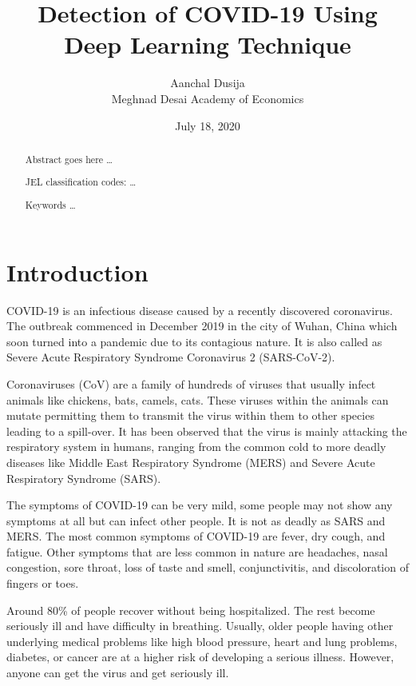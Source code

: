 \documentclass[12pt]{revtex4}
\begin{document}
\title{ Detection of COVID-19 Using Deep Learning Technique}
\author{Aanchal Dusija \\ Meghnad Desai Academy of Economics}
\date{July 18, 2020}

\begin{abstract}
Abstract goes here \dots

JEL classification codes: \dots

Keywords \dots
\end{abstract}

\maketitle

\pagebreak
\section{Introduction}
COVID-19 is an infectious disease caused by a recently discovered coronavirus. The outbreak commenced in December 2019 in the city of Wuhan, China which soon turned into a pandemic due to its contagious nature. It is also called as Severe Acute Respiratory Syndrome Coronavirus 2 (SARS-CoV-2). 

Coronaviruses (CoV) are a family of hundreds of viruses that usually infect animals like chickens, bats, camels, cats. These viruses within the animals can mutate permitting them to transmit the virus within them to other species leading to a spill-over. It has been observed that the virus is mainly attacking the respiratory system in humans, ranging from the common cold to more deadly diseases like Middle East Respiratory Syndrome (MERS) and Severe Acute Respiratory Syndrome (SARS).

The symptoms of COVID-19 can be very mild, some people may not show any symptoms at all but can infect other people. It is not as deadly as SARS and MERS. The most common symptoms of COVID-19 are fever, dry cough, and fatigue. Other symptoms that are less common in nature are headaches, nasal congestion, sore throat, loss of taste and smell, conjunctivitis, and discoloration of fingers or toes.

Around 80\% of people recover without being hospitalized. The rest become seriously ill and have difficulty in breathing. Usually, older people having other underlying medical problems like high blood pressure, heart and lung problems, diabetes, or cancer are at a higher risk of developing a serious illness. However, anyone can get the virus and get seriously ill.
\end{document}
